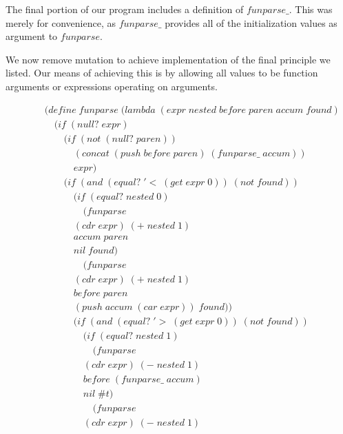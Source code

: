 The final portion of our program includes a definition of $funparse\_$. This was merely 
for convenience, as $funparse\_$ provides all of the initialization values as argument 
to $funparse$.

We now remove mutation to achieve implementation of the final principle we listed. Our 
means of achieving this is by allowing all values to be function arguments or expressions 
operating on arguments.

\begin{figure}[htp]
\footnotesize
\caption{}\label{fig:immutableFunparse}
\begin{align*}
& (define \; funparse \; (lambda \; (expr \; nested \; before \; paren \; accum \; found) \; 
\\& \quad (if \; (null? \; expr)
\\& \qquad (if \; (not \; (null? \; paren))
\\& \qquad \quad (concat \; (push \; before \; paren) \; (funparse\_ \; accum))
\\& \qquad \quad expr)
\\& \qquad (if \; (and \; (equal? \; '< \; (get \; expr \; 0)) \; (not \; found))
\\& \qquad \quad (if \; (equal? \; nested \; 0)
\\& \qquad \qquad (funparse \; 
\\& \qquad \quad (cdr \; expr) \; (+ \; nested \; 1) \; 
\\& \qquad \quad accum \; paren \; 
\\& \qquad \quad nil \; found)
\\& \qquad \qquad (funparse \; 
\\& \qquad \quad (cdr \; expr) \; (+ \; nested \; 1) \; 
\\& \qquad \quad before \; paren \; 
\\& \qquad \quad (push \; accum \; (car \; expr)) \; found))
\\& \qquad \quad (if \; (and \; (equal? \; '> \; (get \; expr \; 0)) \; (not \; found))
\\& \qquad \qquad (if \; (equal? \; nested \; 1)
\\& \qquad \qquad \quad (funparse \; 
\\& \qquad \qquad (cdr \; expr) \; (- \; nested \; 1) \; 
\\& \qquad \qquad before \; (funparse\_ \; accum) \; 
\\& \qquad \qquad nil \; \#t)
\\& \qquad \qquad \quad (funparse \; 
\\& \qquad \qquad (cdr \; expr) \; (- \; nested \; 1) \; 

\end{align*}
\end{figure}
